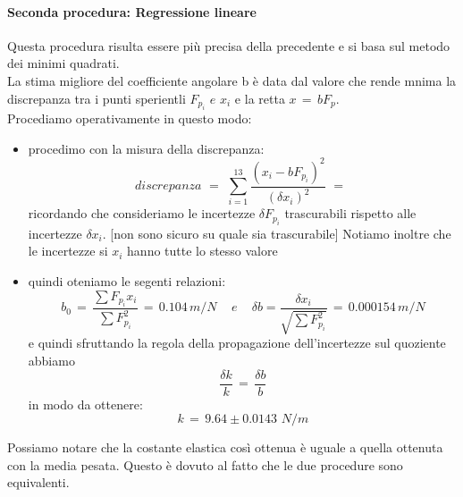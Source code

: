 \paragraph{Seconda procedura: Regressione lineare\\}
Questa procedura risulta essere più precisa della precedente e si basa sul metodo dei minimi quadrati.\\
La stima migliore del coefficiente angolare b è data dal valore che rende mnima la discrepanza tra i punti sperientli $F_{p_i} \,\,e\,\, x_i$ e la retta $x \,=\, bF_p$.\\
Procediamo operativamente in questo modo:
\begin{itemize}
	\item{procedimo con la misura della discrepanza:
			\begin{equation*}
				discrepanza \,\,=\,\, \sum_{i=1}^{13} \frac{(x_i - bF_{p_i})^2}{(\delta x_i)^2} \,\,=\,\,		
			\end{equation*}
			ricordando che consideriamo le incertezze $\delta F_{p_i}$ trascurabili rispetto alle incertezze $\delta x_i$. [non sono sicuro su quale sia trascurabile] Notiamo inoltre che le incertezze si $x_i$ hanno tutte lo stesso valore}
	\item{quindi oteniamo le segenti relazioni:
			\begin{equation*}
				b_0  \,=\,  \frac{\sum F_{p_i}  x_i}{\sum F_{p_i}^2} \,=\, 0.104 \, m/N \,\,\,\,\,\,\, e \,\,\,\,\,\,\,
				\delta b  =  \frac{\delta x_i}{\sqrt{\sum F_{p_i}^2}} \,=\, 0.000154 \, m/N
			\end{equation*}
			e quindi sfruttando la regola della propagazione dell'incertezze sul quoziente abbiamo
			\begin{equation*}
				\frac{\delta k}{k} \,=\, \frac{\delta b}{b}
			\end{equation*}
			in modo da ottenere:
			\begin{equation*}
				k \,=\, 9.64 \pm 0.0143 \,\,N/m
			\end{equation*}
			}
\end{itemize}
Possiamo notare che la costante elastica così ottenua è uguale a quella ottenuta con la media pesata. Questo è dovuto al fatto che le due procedure sono equivalenti.

